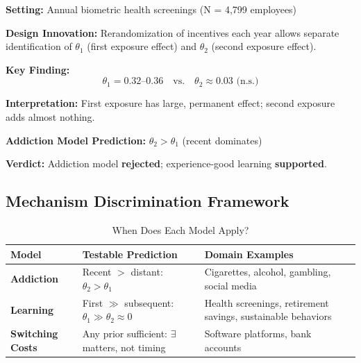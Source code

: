 \documentclass[11pt, a4paper]{article}
\begin{document}
\begin{tcolorbox}[colback=blue!5!white, colframe=blue!75!black,
    title=Jones, Molitor \& Reif (2025): Experience-Good Learning]

\textbf{Setting:} Annual biometric health screenings (N = 4,799 employees)

\textbf{Design Innovation:} Rerandomization of incentives each year allows separate identification of $\theta_1$ (first exposure effect) and $\theta_2$ (second exposure effect).

\textbf{Key Finding:}
\begin{equation}
\theta_1 = 0.32\text{--}0.36 \quad \text{vs.} \quad \theta_2 \approx 0.03 \text{ (n.s.)}
\end{equation}

\textbf{Interpretation:} First exposure has large, permanent effect; second exposure adds almost nothing.

\textbf{Addiction Model Prediction:} $\theta_2 > \theta_1$ (recent dominates)

\textbf{Verdict:} Addiction model \textbf{rejected}; experience-good learning \textbf{supported}.

\end{tcolorbox}

\subsection{Mechanism Discrimination Framework}

\begin{table}[htbp]
\centering
\caption{When Does Each Model Apply?}
\label{tab:lrn-mechanism-domains}
\renewcommand{\arraystretch}{1.4}
\begin{tabular}{@{}p{3cm}p{4cm}p{4.5cm}@{}}
\toprule
\textbf{Model} & \textbf{Testable Prediction} & \textbf{Domain Examples} \\
\midrule
\textbf{Addiction} & Recent $>$ distant: $\theta_2 > \theta_1$ & Cigarettes, alcohol, gambling, social media \\
\textbf{Learning} & First $\gg$ subsequent: $\theta_1 \gg \theta_2 \approx 0$ & Health screenings, retirement savings, sustainable behaviors \\
\textbf{Switching Costs} & Any prior sufficient: $\exists$ matters, not timing & Software platforms, bank accounts \\
\bottomrule
\end{tabular}
\end{table}
\end{document}
